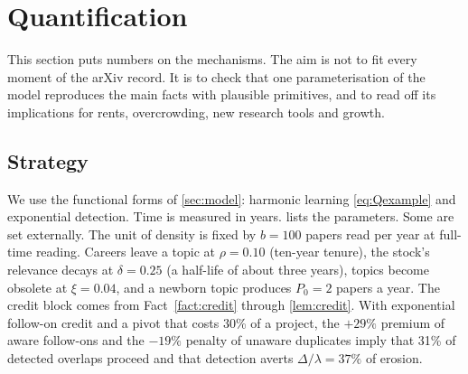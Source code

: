 \section{Quantification}\label{sec:quant}

This section puts numbers on the mechanisms. The aim is not to fit every
moment of the arXiv record. It is to check that one parameterisation of the
model reproduces the main facts with plausible primitives, and to read off its
implications for rents, overcrowding, new research tools and growth.

\subsection{Strategy}

We use the functional forms of \cref{sec:model}: harmonic learning
\eqref{eq:Qexample} and exponential detection. Time is measured in years.
 lists the parameters. Some are set externally. The
unit of density is fixed by $b=100$ papers read per year at full-time reading.
Careers leave a topic at $\rho=0.10$ (ten-year tenure), the stock's relevance
decays at $\delta=0.25$ (a half-life of about three years), topics become
obsolete at $\xi=0.04$, and a newborn topic produces $P_0=2$ papers a year. The
credit block comes from Fact~\ref{fact:credit} through \cref{lem:credit}. With
exponential follow-on credit and a pivot that costs 30\% of a project, the
$+29\%$ premium of aware follow-ons and the $-19\%$ penalty of unaware
duplicates imply that 31\% of detected overlaps proceed and that detection
averts \(\Delta/\lambda=37\%\) of erosion.

